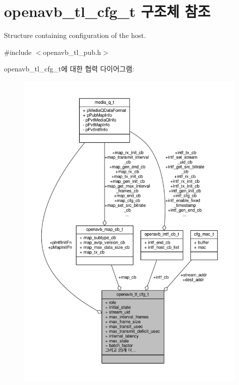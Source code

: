 \hypertarget{structopenavb__tl__cfg__t}{}\section{openavb\+\_\+tl\+\_\+cfg\+\_\+t 구조체 참조}
\label{structopenavb__tl__cfg__t}


Structure containing configuration of the host.  




{\ttfamily \#include $<$openavb\+\_\+tl\+\_\+pub.\+h$>$}



openavb\+\_\+tl\+\_\+cfg\+\_\+t에 대한 협력 다이어그램\+:
\nopagebreak
\begin{figure}[H]
\begin{center}
\leavevmode
\includegraphics[width=350pt]{structopenavb__tl__cfg__t__coll__graph}
\end{center}
\end{figure}

